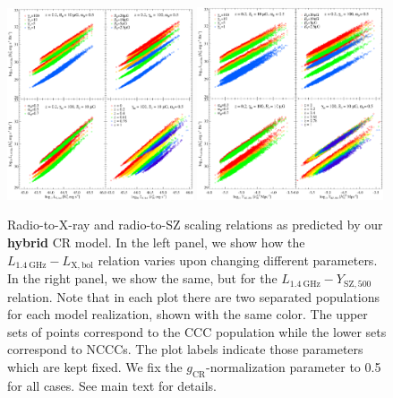 \documentclass[traditabstract]{aa}
\def\C#1{{\bf #1}}
\newcommand{\rmn}{\mathrm}
\begin{document}
\begin{figure}[t]
\centering
\includegraphics[width=0.49\textwidth]{figures/PL_relation_testing_gimp.eps}
\includegraphics[width=0.49\textwidth]{figures/PSZ_relation_testing_gimp.eps}
\caption{Radio-to-X-ray and radio-to-SZ scaling relations as predicted by our
  \C{hybrid} CR model. In the left panel, we show how the
  $L_{1.4~\rmn{GHz}}-L_{\rmn{X,bol}}$ relation varies upon changing different
  parameters. In the right panel, we show the same, but for the
  $L_{1.4~\rmn{GHz}}-Y_{\rmn{SZ},500}$ relation. Note that in each plot there
  are two separated populations for each model realization, shown with the same
  color. The upper sets of points correspond to the CCC population while the
  lower sets correspond to NCCCs. The plot labels indicate those parameters
  which are kept fixed. We fix the $g_{\rmn{CR}}$-normalization parameter to 0.5
  for all cases. See main text for details.}
\label{fig:SR}
\end{figure}
\end{document}
